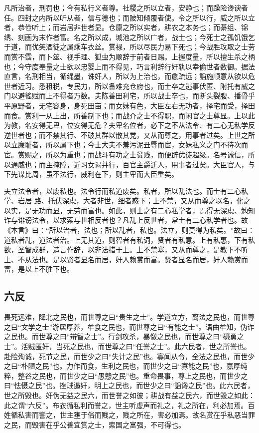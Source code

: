 \documentclass[]{article}
\begin{document}
凡所治者，刑罚也；今有私行义者尊。社稷之所以立者，安静也；而躁险谗谀者任。四封之内所以听从者，信与德也；而陂知倾覆者使。令之所以行，威之所以立者，恭俭听上；而岩居非世者显。仓廪之所以实者，耕农之本务也；而綦组、锦绣、刻画为末作者富。名之所以成，城池之所以广者，战士也；今死士之孤饥饿乞于道，而优笑酒徒之属乘车衣丝。赏禄，所以尽民力易下死也；今战胜攻取之士劳而赏不霑，而卜筮、视手理、狐虫为顺辞于前者日赐。上握度量，所以擅生杀之柄也；今守度奉量之士欲以忠婴上而不得见，巧言利辞行奸轨以幸偷世者数御。据法直言，名刑相当，循绳墨，诛奸人，所以为上治也，而愈疏远；謟施顺意从欲以危世者近习。悉租税，专民力，所以备难充仓府也，而士卒之逃事伏匿、附托有威之门以避徭赋而上不得者万数。夫陈善田利宅，所以战士卒也，而断头裂腹、播骨乎平原野者，无宅容身，身死田亩；而女妹有色，大臣左右无功者，择宅而受，择田而食。赏利一从上出，所善制下也；而战介之士不得职，而闲官之士尊显。上以此为教，名安得无卑，位安得无危？夫卑名位者，必下之不从法令、有二心无私学反逆世者也；而不禁其行、不破其群以散其党，又从而尊之，用事者过矣。上世之所以立廉耻者，所以属下也；今士大夫不羞污泥丑辱而宦，女妹私义之门不待次而宦。赏赐之，所以为重也；而战斗有功之士贫贱，而便辟优徒超级。名号诚信，所以通威也；而主掩障，近习女谒并行，百官主爵迁人，用事者过矣。大臣官人，与下先谋比周，虽不法行，威利在下，则主卑而大臣重矣。

夫立法令者，以废私也。法令行而私道废矣。私者，所以乱法也。而士有二心私学、岩居
路、托伏深虑，大者非世，细者惑下；上不禁，又从而尊之以名，化之以实，是无功而显，无劳而富也。如此，则士之有二心私学者，焉得无深虑、勉知诈与诽谤法令，以求索与世相反者也？凡乱上反世者，常士有二心私学者也。故《本言》曰：``所以治者，法也；所以乱者，私也。法立，则莫得为私矣。''故曰：道私者乱，道法者治。上无其道，则智者有私词，贤者有私意。上有私惠，下有私欲，圣智成群，造言作辞，以非法措于上。上不禁塞，又从而尊之，是教下不听上、不从法也。是以贤者显名而居，奸人赖赏而富。贤者显名而居，奸人赖赏而富，是以上不胜下也。

\hypertarget{header-n1589}{%
\subsection{六反}\label{header-n1589}}

畏死远难，降北之民也，而世尊之曰``贵生之士''。学道立方，离法之民也，而世尊之曰``文学之士''游居厚养，牟食之民也，而世尊之曰``有能之士''。语曲牟知，伪诈之民也。而世尊之曰``辩智之士''。行剑攻杀，暴憿之民也，而世尊之曰``磏勇之士''。活贼匿奸，当死之民也，而世尊之曰``任誉之士''。此六民者，世之所誉也。赴险殉诚，死节之民，而世少之曰``失计之民''也。寡闻从令，全法之民也，而世少之曰``朴陋之民''也。力作而食，生利之民也，而世少之曰``寡能之民''也，嘉厚纯粹，整谷之民也，而世少之曰``愚戆之民''也。重命畏事，尊上之民也，而世少之曰``怯慑之民''也。挫贼遏奸，明上之民也，而世少之曰``謟谗之民''也。此六民者，世之所毁也。奸伪无益之民六，而世誉之如彼；耕战有益之民六，而世毁之如此：此之谓``六反''。布衣循私利而誉之，世主听虚声而礼之，礼之所在，利必加焉。百姓循私害而訾之，世主壅于俗而贱之，贱之所在，害必加焉。故名赏在乎私恶当罪之民，而毁害在乎公善宜赏之士，索国之富强，不可得也。
\end{document}

